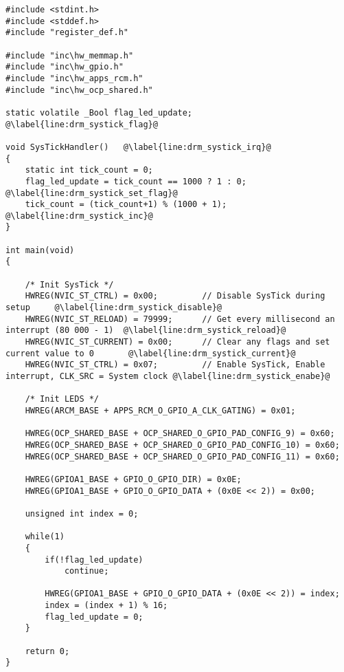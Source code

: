 \newpage
\begin{lstlisting}[style=CStyle, caption={Toggling LEDs according to Table \ref{tab:led_scheme} using DRM programming technique}, captionpos=b, label={lst:led_systick_drm}, escapechar=@]
#include <stdint.h>
#include <stddef.h>
#include "register_def.h"

#include "inc\hw_memmap.h"
#include "inc\hw_gpio.h"
#include "inc\hw_apps_rcm.h"
#include "inc\hw_ocp_shared.h"

static volatile _Bool flag_led_update;  @\label{line:drm_systick_flag}@

void SysTickHandler()   @\label{line:drm_systick_irq}@
{
    static int tick_count = 0;
    flag_led_update = tick_count == 1000 ? 1 : 0;   @\label{line:drm_systick_set_flag}@
    tick_count = (tick_count+1) % (1000 + 1);       @\label{line:drm_systick_inc}@
}

int main(void)
{

    /* Init SysTick */
    HWREG(NVIC_ST_CTRL) = 0x00;         // Disable SysTick during setup     @\label{line:drm_systick_disable}@
    HWREG(NVIC_ST_RELOAD) = 79999;      // Get every millisecond an interrupt (80 000 - 1)  @\label{line:drm_systick_reload}@
    HWREG(NVIC_ST_CURRENT) = 0x00;      // Clear any flags and set current value to 0       @\label{line:drm_systick_current}@
    HWREG(NVIC_ST_CTRL) = 0x07;         // Enable SysTick, Enable interrupt, CLK_SRC = System clock @\label{line:drm_systick_enabe}@

    /* Init LEDS */
    HWREG(ARCM_BASE + APPS_RCM_O_GPIO_A_CLK_GATING) = 0x01;

    HWREG(OCP_SHARED_BASE + OCP_SHARED_O_GPIO_PAD_CONFIG_9) = 0x60;
    HWREG(OCP_SHARED_BASE + OCP_SHARED_O_GPIO_PAD_CONFIG_10) = 0x60;
    HWREG(OCP_SHARED_BASE + OCP_SHARED_O_GPIO_PAD_CONFIG_11) = 0x60;

    HWREG(GPIOA1_BASE + GPIO_O_GPIO_DIR) = 0x0E;
    HWREG(GPIOA1_BASE + GPIO_O_GPIO_DATA + (0x0E << 2)) = 0x00;

    unsigned int index = 0;

    while(1)
    {
        if(!flag_led_update)
            continue;

        HWREG(GPIOA1_BASE + GPIO_O_GPIO_DATA + (0x0E << 2)) = index;
        index = (index + 1) % 16;
        flag_led_update = 0;
    }

    return 0;
}
\end{lstlisting}

